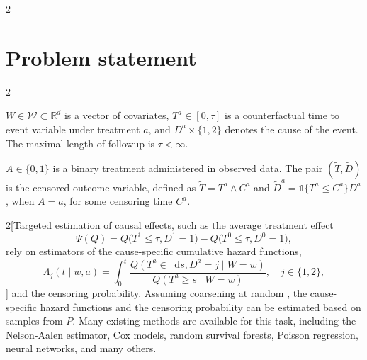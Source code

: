 \documentclass[a0,portrait]{a0poster}
\newcommand*\diff{\mathop{}\!\mathrm{d}}
\newcommand{\R}{\mathbb{R}}
\newcommand{\1}{\mathds{1}}
\begin{document}
\begin{minipage}{\textwidth}
\begin{minipage}[t]{1\linewidth}
\begin{multicols}{2}
\section*{Problem statement}
\vspace{-.2em}
\setlength{\columnseprule}{0pt}
\setlength{\columnsep}{30pt}
\begin{multicols}{2}
  \begin{tcolorbox}[width=\linewidth,colframe=white, title={\center \textbf{Ideal data: \( \left(W,
      T^{0}, D^{0}, T^{1}, D^{1}\right) \sim Q \)}}, coltitle=black, colbacktitle=white]
\( W \in \mathcal{W} \subset \R^d \) is a vector of covariates,
\( T^{a} \in [0, \tau] \) is a counterfactual time to event variable under
treatment \( a \), and \( D^{a} \times \{1,2\} \) denotes the cause of the
event. The maximal length of followup is $\tau <\infty$.
\end{tcolorbox}

\begin{tcolorbox}[width=\linewidth,colframe=white, title={\center\textbf{
      Observed data: \( O= (W,
    A, \tilde T, \tilde D) \sim P \)}}, coltitle=black,
  colbacktitle=white]
  \( A \in {\{0,1\}} \) is a binary treatment administered in observed
  data. The pair \( (\tilde T, \tilde D) \) is the censored
  outcome variable, defined as \( \tilde T = T^a \wedge C^a \) and
  \( \tilde D^a = \1{\{T^a \leq C^a\}} D^a \), when \( A=a \), for some
  censoring time \( C^a \).
\end{tcolorbox}
\end{multicols}

\begin{multicols}{2}[{Targeted estimation of causal effects, such as the average treatment effect
    \begin{equation*}
      \Psi(Q) = 
      Q{
        \bigl(
          T^{1} \leq \tau, D^{1}=1
        \bigr)}-
      Q{\bigl(
          T^{0} \leq \tau, D^{0}=1
        \bigr)},
    \end{equation*}
    rely on estimators of the cause-specific cumulative hazard functions,
\begin{equation*}
  \Lambda_{j}(t \mid w, a) = \int_0^t\frac{  Q(T^a \in \diff s, D^a=j \mid W=w)}
  {Q(T^a \geq s \mid W=w)},
  \quad j \in \{1,2\},
\end{equation*}\vspace{-1em}}]
and the censoring probability. Assuming coarsening at random
\cite{gill1997coarsening,van2003unified}, the cause-specific hazard functions
and the censoring probability can be estimated based on samples from \( P \).
Many existing methods are available for this task, including the Nelson-Aalen
estimator, Cox models, random survival forests, Poisson regression, neural
networks, and many others. %


\end{multicols}
\end{multicols}
\end{minipage}
\end{minipage}
\end{document}
